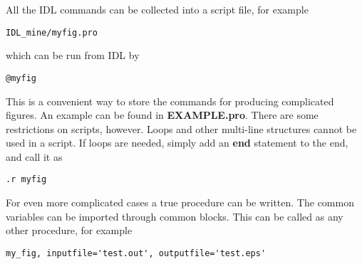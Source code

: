 \documentclass{article}
\begin{document}
All the IDL commands can be collected into a script file, for example 
\begin{verbatim}
IDL_mine/myfig.pro
\end{verbatim}
which can be run from IDL by
\begin{verbatim}
@myfig
\end{verbatim}
This is a convenient way to store the commands for producing complicated 
figures. An example can be found in {\bf EXAMPLE.pro}. There are some
restrictions on scripts, however. Loops and other multi-line structures
cannot be used in a script. If loops are needed, simply add an 
{\bf end} statement to the end, and call it as
\begin{verbatim}
.r myfig
\end{verbatim}
For even more complicated cases a true procedure can be written.
The common variables can be imported through common blocks.
This can be called as any other procedure, for example
\begin{verbatim}
my_fig, inputfile='test.out', outputfile='test.eps'
\end{verbatim}
\end{document}
